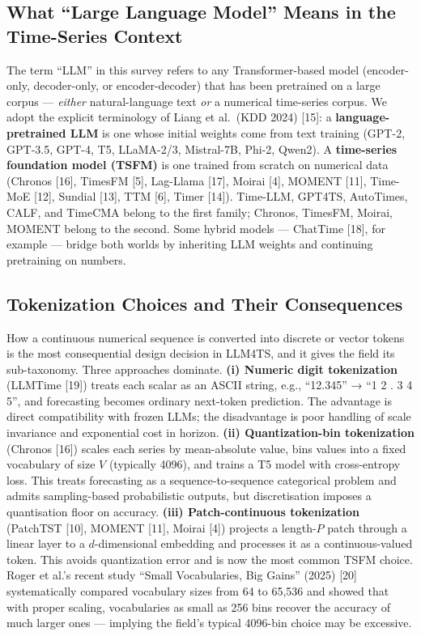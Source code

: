 \documentclass{article}
\begin{document}
\subsection{What ``Large Language Model'' Means in the Time-Series Context}\label{what-large-language-model-means-in-the-time-series-context}

The term ``LLM'' in this survey refers to any Transformer-based model (encoder-only, decoder-only, or encoder-decoder) that has been pretrained on a large corpus --- \emph{either} natural-language text \emph{or} a numerical time-series corpus. We adopt the explicit terminology of Liang et al.~(KDD 2024) {[}15{]}: a \textbf{language-pretrained LLM} is one whose initial weights come from text training (GPT-2, GPT-3.5, GPT-4, T5, LLaMA-2/3, Mistral-7B, Phi-2, Qwen2). A \textbf{time-series foundation model (TSFM)} is one trained from scratch on numerical data (Chronos {[}16{]}, TimesFM {[}5{]}, Lag-Llama {[}17{]}, Moirai {[}4{]}, MOMENT {[}11{]}, Time-MoE {[}12{]}, Sundial {[}13{]}, TTM {[}6{]}, Timer {[}14{]}). Time-LLM, GPT4TS, AutoTimes, CALF, and TimeCMA belong to the first family; Chronos, TimesFM, Moirai, MOMENT belong to the second. Some hybrid models --- ChatTime {[}18{]}, for example --- bridge both worlds by inheriting LLM weights and continuing pretraining on numbers.

\subsection{Tokenization Choices and Their Consequences}\label{tokenization-choices-and-their-consequences}

How a continuous numerical sequence is converted into discrete or vector tokens is the most consequential design decision in LLM4TS, and it gives the field its sub-taxonomy. Three approaches dominate. \textbf{(i) Numeric digit tokenization} (LLMTime {[}19{]}) treats each scalar as an ASCII string, e.g., ``12.345'' → ``1 2 . 3 4 5'', and forecasting becomes ordinary next-token prediction. The advantage is direct compatibility with frozen LLMs; the disadvantage is poor handling of scale invariance and exponential cost in horizon. \textbf{(ii) Quantization-bin tokenization} (Chronos {[}16{]}) scales each series by mean-absolute value, bins values into a fixed vocabulary of size \(V\) (typically 4096), and trains a T5 model with cross-entropy loss. This treats forecasting as a sequence-to-sequence categorical problem and admits sampling-based probabilistic outputs, but discretisation imposes a quantisation floor on accuracy. \textbf{(iii) Patch-continuous tokenization} (PatchTST {[}10{]}, MOMENT {[}11{]}, Moirai {[}4{]}) projects a length-\(P\) patch through a linear layer to a \(d\)-dimensional embedding and processes it as a continuous-valued token. This avoids quantization error and is now the most common TSFM choice. Roger et al.'s recent study ``Small Vocabularies, Big Gains'' (2025) {[}20{]} systematically compared vocabulary sizes from 64 to 65,536 and showed that with proper scaling, vocabularies as small as 256 bins recover the accuracy of much larger ones --- implying the field's typical 4096-bin choice may be excessive.
\end{document}
